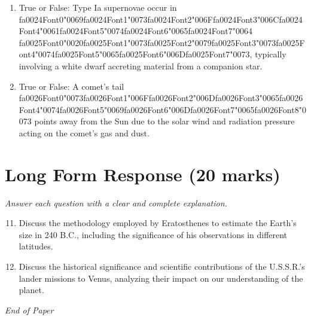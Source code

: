 \documentclass[12pt]{article}
\begin{document}
\begin{enumerate}[label=\arabic*.]
\item True or False: Type Ia supernovae occur in {\csname fa0024Font0\endcsname\char"0069}{\csname fa0024Font1\endcsname\char"0073}{\csname fa0024Font2\endcsname\char"006F}{\csname fa0024Font3\endcsname\char"006C}{\csname fa0024Font4\endcsname\char"0061}{\csname fa0024Font5\endcsname\char"0074}{\csname fa0024Font6\endcsname\char"0065}{\csname fa0024Font7\endcsname\char"0064} {\csname fa0025Font0\endcsname\char"0020}{\csname fa0025Font1\endcsname\char"0073}{\csname fa0025Font2\endcsname\char"0079}{\csname fa0025Font3\endcsname\char"0073}{\csname fa0025Font4\endcsname\char"0074}{\csname fa0025Font5\endcsname\char"0065}{\csname fa0025Font6\endcsname\char"006D}{\csname fa0025Font7\endcsname\char"0073}, typically involving a white dwarf accreting material from a companion star.
\item True or False: A comet's tail {\csname fa0026Font0\endcsname\char"0073}{\csname fa0026Font1\endcsname\char"006F}{\csname fa0026Font2\endcsname\char"006D}{\csname fa0026Font3\endcsname\char"0065}{\csname fa0026Font4\endcsname\char"0074}{\csname fa0026Font5\endcsname\char"0069}{\csname fa0026Font6\endcsname\char"006D}{\csname fa0026Font7\endcsname\char"0065}{\csname fa0026Font8\endcsname\char"0073} points away from the Sun due to the solar wind and radiation pressure acting on the comet's gas and dust.
\end{enumerate}

\section*{Long Form Response (20 marks)}
\textit{Answer each question with a clear and complete explanation.}
\begin{enumerate}[label=\arabic*.]
\setcounter{enumi}{10}
\item Discuss the methodology employed by Eratosthenes to estimate the Earth's size in 240 B.C.,
including the significance of his observations in different latitudes.
\item Discuss the historical significance and scientific contributions of the U.S.S.R.'s lander
missions to Venus, analyzing their impact on our understanding of the planet.
\end{enumerate}

\vfill
\noindent\textit{End of Paper}
\end{document}
